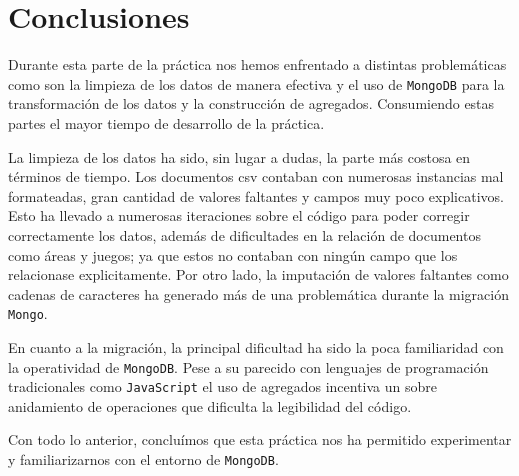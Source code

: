 \documentclass[]{article}
\begin{document}
\section{Conclusiones}
\label{sec:conclusiones}

Durante esta parte de la práctica nos hemos enfrentado a distintas problemáticas como son la limpieza de los datos de manera efectiva y el uso de \texttt{MongoDB} para la transformación de los datos y la construcción de agregados. Consumiendo estas partes el mayor tiempo de desarrollo de la práctica.

La limpieza de los datos ha sido, sin lugar a dudas, la parte más costosa en términos de tiempo. Los documentos csv contaban con numerosas instancias mal formateadas, gran cantidad de valores faltantes y campos muy poco explicativos. Esto ha llevado a numerosas iteraciones sobre el código para poder corregir correctamente los datos, además de dificultades en la relación de documentos como áreas y juegos; ya que estos no contaban con ningún campo que los relacionase explicitamente. Por otro lado, la imputación de valores faltantes como cadenas de caracteres ha generado más de una problemática durante la migración \texttt{Mongo}.

En cuanto a la migración, la principal dificultad ha sido la poca familiaridad con la operatividad de \texttt{MongoDB}. Pese a su parecido con lenguajes de programación tradicionales como \texttt{JavaScript} el uso de agregados incentiva un sobre anidamiento de operaciones que dificulta la legibilidad del código.

Con todo lo anterior, concluímos que esta práctica nos ha permitido experimentar y familiarizarnos con el entorno de \texttt{MongoDB}.
\end{document}
